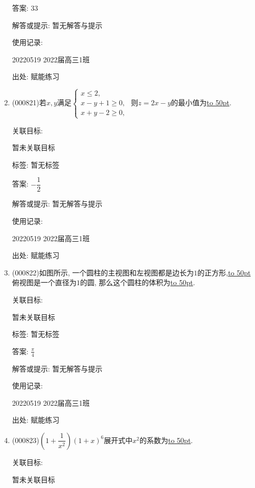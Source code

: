 \documentclass[10pt,a4paper]{article}
\newcommand{\blank}[1]{\underline{\hbox to #1pt{}}}
\begin{document}
\begin{enumerate}[1.]
答案: $33$

解答或提示: 暂无解答与提示

使用记录:

20220519	2022届高三1班	


出处: 赋能练习
\item { (000821)}若$x,y$满足$\begin{cases}x\le 2, \\ x-y+1\ge 0, \\ x+y-2\ge 0,\end{cases}$ 则$z=2x-y$的最小值为\blank{50}.


关联目标:

暂未关联目标



标签: 暂无标签

答案: $-\dfrac 12$

解答或提示: 暂无解答与提示

使用记录:

20220519	2022届高三1班	


出处: 赋能练习
\item { (000822)}如图所示, 一个圆柱的主视图和左视图都是边长为$1$的正方形,\blank{50}俯视图是一个直径为$1$的圆, 那么这个圆柱的体积为\blank{50}.
\begin{center}
\end{center}


关联目标:

暂未关联目标



标签: 暂无标签

答案: $\frac{\pi}4$

解答或提示: 暂无解答与提示

使用记录:

20220519	2022届高三1班	


出处: 赋能练习
\item { (000823)}$(1+\dfrac1{x^2})(1+x)^6$展开式中$x^2$的系数为\blank{50}.


关联目标:

暂未关联目标




\end{enumerate}
\end{document}
